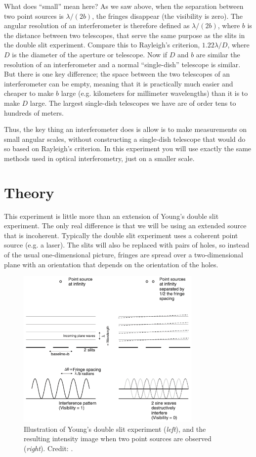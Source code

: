 \documentclass[11pt]{article}
\begin{document}
What does ``small'' mean here? As we saw above, when the separation between two point sources is $\lambda/(2b)$, the fringes disappear (the visibility is zero). The angular resolution of an interferometer is therefore defined as $\lambda/(2b)$, where $b$ is the distance between two telescopes, that serve the same purpose as the slits in the double slit experiment. Compare this to Rayleigh's criterion, $1.22 \lambda/D$, where $D$ is the diameter of the aperture or telescope. Now if $D$ and $b$ are similar the resolution of an interferometer and a normal ``single-dish'' telescope is similar. But there is one key difference; the space between the two telescopes of an interferometer can be empty, meaning that it is practically much easier and cheaper to make $b$ large (e.g. kilometers for millimeter wavelengths) than it is to make $D$ large. The largest single-dish telescopes we have are of order tens to hundreds of meters.

Thus, the key thing an interferometer does is allow is to make measurements on small angular scales, without constructing a single-dish telescope that would do so based on Rayleigh's criterion. In this experiment you will use exactly the same methods used in optical interferometry, just on a smaller scale.

\section{Theory}

This experiment is little more than an extension of Young's double slit experiment. The only real difference is that we will be using an extended source that is incoherent. Typically the double slit experiment uses a coherent point source (e.g. a laser). The slits will also be replaced with pairs of holes, so instead of the usual one-dimensional picture, fringes are spread over a two-dimensional plane with an orientation that depends on the orientation of the holes. 

\begin{figure}[h]
    \centering
    \includegraphics[width=0.8\textwidth]{doc/youngs.png}
    \caption{Illustration of Young's double slit experiment (\emph{left}), and the resulting intensity image when two point sources are observed (\emph{right}). Credit: \citet{2003RPPh...66..789M}.}
    \label{fig:youngs}
\end{figure}
\end{document}

